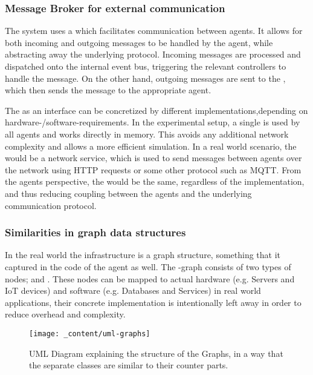 \subsubsection{Message Broker for external communication}
\label{sssec:message-broker}
The system uses a  which facilitates communication between agents. It allows for both incoming and outgoing messages to be handled by the agent, while abstracting away the underlying protocol. Incoming messages are processed and dispatched onto the internal event bus, triggering the relevant controllers to handle the message. On the other hand, outgoing messages are sent to the , which then sends the message to the appropriate agent.

The  as an interface can be concretized by different implementations,depending on hardware-/software-requirements. In the experimental setup, a single  is used by all agents and works directly in memory. This avoids any additional network complexity and allows a more efficient simulation. In a real world scenario, the  would be a network service, which is used to send messages between agents over the network using HTTP requests or some other protocol such as MQTT. From the agents perspective, the  would be the same, regardless of the implementation, and thus reducing coupling between the agents and the underlying communication protocol.

\subsubsection{Similarities in graph data structures}
\label{sssec:graph-data-structures}
In the real world the infrastructure is a graph structure, something that it  captured in the code of the agent as well. The -graph consists of two types of nodes;  and . These nodes can be mapped to actual hardware (e.g. Servers and IoT devices) and software (e.g. Databases and Services) in real world applications, their concrete implementation is intentionally left away in order to reduce overhead and complexity.

\begin{figure}[H]
    \centering
    \texttt{[image: \_content/uml-graphs]}
    \caption{UML Diagram explaining the structure of the Graphs, in a way that the separate classes are similar to their counter parts.}
    \label{fig:uml-graphs}
\end{figure}


